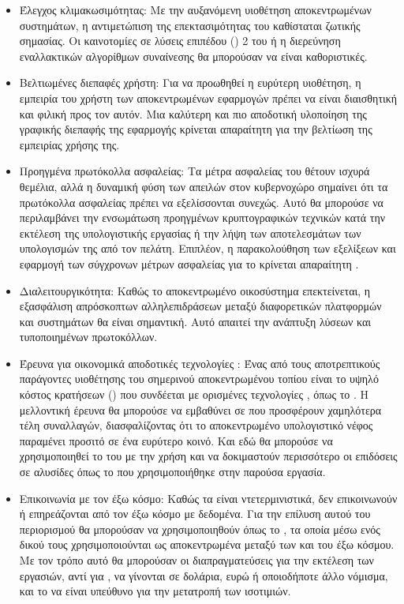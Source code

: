 \begin{itemize}
\item Έλεγχος κλιμακωσιμότητας: Με την αυξανόμενη υιοθέτηση αποκεντρωμένων συστημάτων, η αντιμετώπιση της επεκτασιμότητας του  καθίσταται ζωτικής σημασίας. Οι καινοτομίες σε λύσεις επιπέδου () 2 του  \cite{ref24} ή η διερεύνηση εναλλακτικών αλγορίθμων συναίνεσης θα μπορούσαν να είναι καθοριστικές.
\item Βελτιωμένες διεπαφές χρήστη: Για να προωθηθεί η ευρύτερη υιοθέτηση, η εμπειρία του χρήστη των αποκεντρωμένων εφαρμογών πρέπει να είναι διαισθητική και φιλική προς τον αυτόν. Μια καλύτερη και πιο αποδοτική υλοποίηση της γραφικής διεπαφής της εφαρμογής κρίνεται απαραίτητη για την βελτίωση της εμπειρίας χρήσης της.
\item Προηγμένα πρωτόκολλα ασφαλείας: Τα μέτρα ασφαλείας του  θέτουν ισχυρά θεμέλια, αλλά η δυναμική φύση των απειλών στον κυβερνοχώρο σημαίνει ότι τα πρωτόκολλα ασφαλείας πρέπει να εξελίσσονται συνεχώς. Αυτό θα μπορούσε να περιλαμβάνει την ενσωμάτωση προηγμένων κρυπτογραφικών τεχνικών κατά την εκτέλεση της υπολογιστικής εργασίας ή την λήψη των αποτελεσμάτων των υπολογισμών της από τον πελάτη. Επιπλέον, η παρακολούθηση των εξελίξεων και εφαρμογή των σύγχρονων μέτρων ασφαλείας για το  κρίνεται απαραίτητη \cite{ref46,ref47}.
\item Διαλειτουργικότητα: Καθώς το αποκεντρωμένο οικοσύστημα επεκτείνεται, η εξασφάλιση απρόσκοπτων αλληλεπιδράσεων μεταξύ διαφορετικών πλατφορμών και συστημάτων  θα είναι σημαντική. Αυτό απαιτεί την ανάπτυξη λύσεων  και τυποποιημένων πρωτοκόλλων.
\item Έρευνα για οικονομικά αποδοτικές τεχνολογίες : Ένας από τους αποτρεπτικούς παράγοντες υιοθέτησης του σημερινού αποκεντρωμένου τοπίου είναι το υψηλό κόστος κρατήσεων ()  που συνδέεται με ορισμένες τεχνολογίες , όπως το . Η μελλοντική έρευνα θα μπορούσε να εμβαθύνει σε  που προσφέρουν χαμηλότερα τέλη συναλλαγών, διασφαλίζοντας ότι το αποκεντρωμένο υπολογιστικό νέφος παραμένει προσιτό σε ένα ευρύτερο κοινό. Και εδώ θα μπορούσε να χρησιμοποιηθεί το  του  με την χρήση  \cite{ref24} και να δοκιμαστούν περισσότερο οι επιδόσεις σε αλυσίδες όπως το  που χρησιμοποιήθηκε στην παρούσα εργασία.
\item Επικοινωνία με τον έξω κόσμο: Καθώς τα  είναι ντετερμινιστικά, δεν επικοινωνούν ή επηρεάζονται από τον έξω κόσμο με  δεδομένα. Για την επίλυση αυτού του περιορισμού θα μπορούσαν να χρησιμοποιηθούν  όπως το  \cite{ref48}, τα οποία μέσω ενός δικού τους  χρησιμοποιούνται ως αποκεντρωμένα  μεταξύ των  και του έξω κόσμου. Με τον τρόπο αυτό θα μπορούσαν οι διαπραγματεύσεις για την εκτέλεση των εργασιών, αντί για , να γίνονται σε δολάρια, ευρώ ή οποιοδήποτε άλλο νόμισμα, και το  να είναι υπεύθυνο για την μετατροπή των ισοτιμιών.

\end{itemize}
